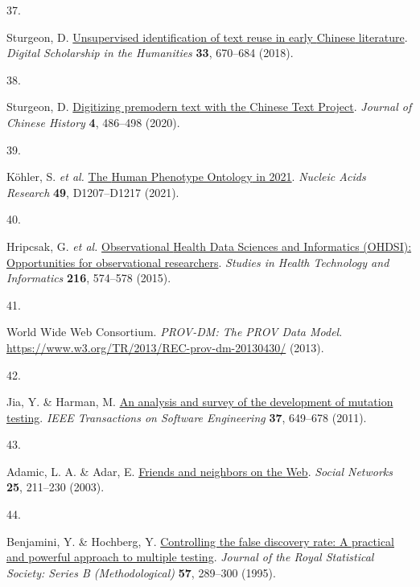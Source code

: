 \documentclass[
]{article}
\newlength{\cslhangindent}
\newlength{\csllabelwidth}
\newlength{\cslentryspacingunit} %
\newenvironment{CSLReferences}[2] %
 {%
  \setlength{\parindent}{0pt}
  \ifodd #1
  \let\oldpar\par
  \def\par{\hangindent=\cslhangindent\oldpar}
  \fi
  \setlength{\parskip}{#2\cslentryspacingunit}
 }%
 {}
\newcommand{\CSLLeftMargin}[1]{\parbox[t]{\csllabelwidth}{#1}}
\newcommand{\CSLRightInline}[1]{\parbox[t]{\linewidth - \csllabelwidth}{#1}\break}
\begin{document}
\begin{CSLReferences}{0}{0}
\leavevmode{}%
\CSLLeftMargin{37. }%
\CSLRightInline{Sturgeon, D.
\href{https://doi.org/10.1093/llc/fqx024}{Unsupervised identification of
text reuse in early {Chinese} literature}. \emph{Digital Scholarship in
the Humanities} \textbf{33}, 670--684 (2018).}

\leavevmode{}%
\CSLLeftMargin{38. }%
\CSLRightInline{Sturgeon, D.
\href{https://doi.org/10.1017/jch.2020.19}{Digitizing premodern text
with the {Chinese Text Project}}. \emph{Journal of Chinese History}
\textbf{4}, 486--498 (2020).}

\leavevmode{}%
\CSLLeftMargin{39. }%
\CSLRightInline{Köhler, S. \emph{et al.}
\href{https://doi.org/10.1093/nar/gkaa1043}{The {Human Phenotype
Ontology} in 2021}. \emph{Nucleic Acids Research} \textbf{49},
D1207--D1217 (2021).}

\leavevmode{}%
\CSLLeftMargin{40. }%
\CSLRightInline{Hripcsak, G. \emph{et al.}
\href{https://doi.org/10.3233/978-1-61499-564-7-574}{Observational
{Health Data Sciences and Informatics} ({OHDSI}): Opportunities for
observational researchers}. \emph{Studies in Health Technology and
Informatics} \textbf{216}, 574--578 (2015).}

\leavevmode{}%
\CSLLeftMargin{41. }%
\CSLRightInline{World Wide Web Consortium. \emph{{PROV-DM}: The {PROV}
Data Model}. \url{https://www.w3.org/TR/2013/REC-prov-dm-20130430/}
(2013).}

\leavevmode{}%
\CSLLeftMargin{42. }%
\CSLRightInline{Jia, Y. \& Harman, M.
\href{https://doi.org/10.1109/TSE.2010.62}{An analysis and survey of the
development of mutation testing}. \emph{IEEE Transactions on Software
Engineering} \textbf{37}, 649--678 (2011).}

\leavevmode{}%
\CSLLeftMargin{43. }%
\CSLRightInline{Adamic, L. A. \& Adar, E.
\href{https://doi.org/10.1016/S0378-8733(03)00009-1}{Friends and
neighbors on the {Web}}. \emph{Social Networks} \textbf{25}, 211--230
(2003).}

\leavevmode{}%
\CSLLeftMargin{44. }%
\CSLRightInline{Benjamini, Y. \& Hochberg, Y.
\href{https://doi.org/10.1111/j.2517-6161.1995.tb02031.x}{Controlling
the false discovery rate: A practical and powerful approach to multiple
testing}. \emph{Journal of the Royal Statistical Society: Series B
(Methodological)} \textbf{57}, 289--300 (1995).}


\end{CSLReferences}
\end{document}
